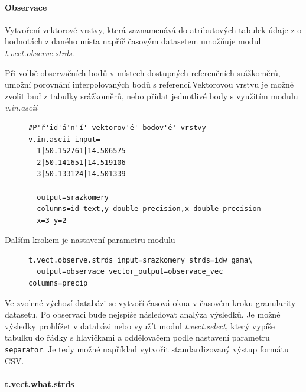 \documentclass[a4paper,12pt,oneside]{report}
\begin{document}
\paragraph{Observace}
Vytvoření vektorové vrstvy, která zaznamenává do atributových tabulek údaje z o hodnotách z daného místa napříč časovým datasetem umožňuje modul \textit{t.vect.observe.strds}.

Při volbě observačních bodů v místech dostupných referenčních srážkoměrů, umožní porovnání interpolovaných bodů s referencí.Vektorovou vrstvu je možné zvolit buď z tabulky srážkoměrů, nebo přidat jednotlivé body s využitím modulu \textit{v.in.ascii}
\begin{figure}[h!]
\begin{footnotesize}
\lstset{extendedchars=false,
escapeinside=''}
\begin{lstlisting}[style=mybash]
#P'ř'id'á'n'í' vektorov'é' bodov'é' vrstvy
v.in.ascii input=
  1|50.152761|14.506575
  2|50.141651|14.519106
  3|50.133124|14.501339
  
  output=srazkomery 
  columns=id text,y double precision,x double precision 
  x=3 y=2
\end{lstlisting}
\end{footnotesize} 
\end{figure}

Dalším krokem je nastavení parametru modulu
\begin{figure}[h!]
\begin{footnotesize}
\lstset{extendedchars=false,
escapeinside=''}
\begin{lstlisting}[style=mybash]
t.vect.observe.strds input=srazkomery strds=idw_gama\
  output=observace vector_output=observace_vec columns=precip
\end{lstlisting}
\end{footnotesize} 
\end{figure}

Ve zvolené výchozí databázi se vytvoří časová okna v časovém kroku granularity datasetu.
Po observaci bude nejspíše následovat analýza výsledků. Je možné výsledky prohlížet v databázi nebo využít modul \textit{t.vect.select}, který vypíše tabulku do řádky s hlavičkami a oddělovačem podle nastavení parametru \texttt{separator}. Je tedy možné například vytvořit standardizovaný výstup formátu CSV.

\paragraph*{t.vect.what.strds}
\end{document}
